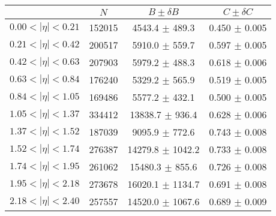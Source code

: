 \begin{tabular}{lccc}
\hline
    &   $N$   & $B \pm \delta B$  &  $C \pm \delta C$ \\
\hline
$0.00 < |\eta| <0.21$          & 152015     & 4543.4     $\pm$ 489.3 & 0.450      $\pm$ 0.005 \\
$0.21 < |\eta| <0.42$          & 200517     & 5910.0     $\pm$ 559.7 & 0.597      $\pm$ 0.005 \\
$0.42 < |\eta| <0.63$          & 207903     & 5979.2     $\pm$ 488.3 & 0.618      $\pm$ 0.006 \\
$0.63 < |\eta| <0.84$          & 176240     & 5329.2     $\pm$ 565.9 & 0.519      $\pm$ 0.005 \\
$0.84 < |\eta| <1.05$          & 169486     & 5577.2     $\pm$ 432.1 & 0.500      $\pm$ 0.005 \\
$1.05 < |\eta| <1.37$          & 334412     & 13838.7    $\pm$ 936.4 & 0.628      $\pm$ 0.006 \\
$1.37 < |\eta| <1.52$          & 187039     & 9095.9     $\pm$ 772.6 & 0.743      $\pm$ 0.008 \\
$1.52 < |\eta| <1.74$          & 276387     & 14279.8    $\pm$ 1042.2 & 0.733      $\pm$ 0.008 \\
$1.74 < |\eta| <1.95$          & 261062     & 15480.3    $\pm$ 855.6 & 0.726      $\pm$ 0.008 \\
$1.95 < |\eta| <2.18$          & 273678     & 16020.1    $\pm$ 1134.7 & 0.691      $\pm$ 0.008 \\
$2.18 < |\eta| <2.40$          & 257557     & 14520.0    $\pm$ 1067.6 & 0.689      $\pm$ 0.009 \\
\hline
\end{tabular}
